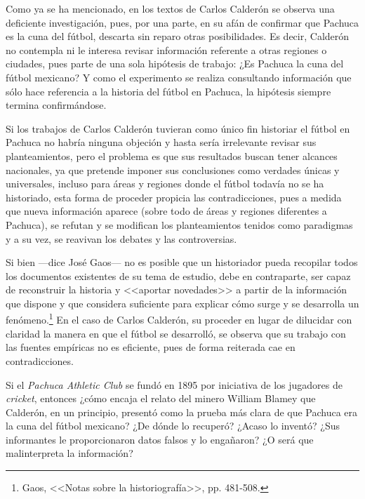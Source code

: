 \documentclass[11pt,a5paper,twoside]{book} %
\begin{document}
Como ya se ha mencionado, en los textos de Carlos Calderón se observa una
deficiente investigación, pues, por una parte, en su afán de confirmar que Pachuca es la cuna
del fútbol, descarta sin reparo otras posibilidades. Es decir, Calderón no contempla ni le
interesa revisar información referente a otras regiones o ciudades, pues parte de una sola
hipótesis de trabajo: ¿Es Pachuca la cuna del fútbol mexicano? Y como el experimento se
realiza consultando información que sólo hace referencia a la historia del fútbol en Pachuca,
la hipótesis siempre termina confirmándose.

Si los trabajos de Carlos Calderón tuvieran como único fin historiar el fútbol en
Pachuca no habría ninguna objeción y hasta sería irrelevante revisar sus planteamientos, pero
el problema es que sus resultados buscan tener alcances nacionales, ya que pretende imponer
sus conclusiones como verdades únicas y universales, incluso para áreas y regiones donde el
fútbol todavía no se ha historiado, esta forma de proceder propicia las contradicciones, pues
a medida que nueva información aparece (sobre todo de áreas y regiones diferentes a
Pachuca), se refutan y se modifican los planteamientos tenidos como paradigmas y a su vez,
se reavivan los debates y las controversias.

Si bien ---dice José Gaos--- no es posible que un historiador pueda recopilar todos los
documentos existentes de su tema de estudio, debe en contraparte, ser capaz de reconstruir la historia y <<aportar novedades>> a partir de la información que dispone y que considera suficiente para explicar cómo surge y se desarrolla un fenómeno.\footnote{Gaos, <<Notas sobre la historiografía>>, pp. 481-508.} En el caso de Carlos Calderón, su proceder en lugar de dilucidar con claridad la manera en que el fútbol se desarrolló, se observa que su trabajo con las fuentes empíricas no es eficiente, pues de forma
reiterada cae en contradicciones.

Si el \emph{Pachuca Athletic Club} se fundó en 1895 por iniciativa de los jugadores de
\emph{cricket}, entonces ¿cómo encaja el relato del minero William Blamey que Calderón, en un
principio, presentó como la prueba más clara de que Pachuca era la cuna del fútbol mexicano?
¿De dónde lo recuperó? ¿Acaso lo inventó? ¿Sus informantes le proporcionaron datos falsos
y lo engañaron? ¿O será que malinterpreta la información?
\end{document}
